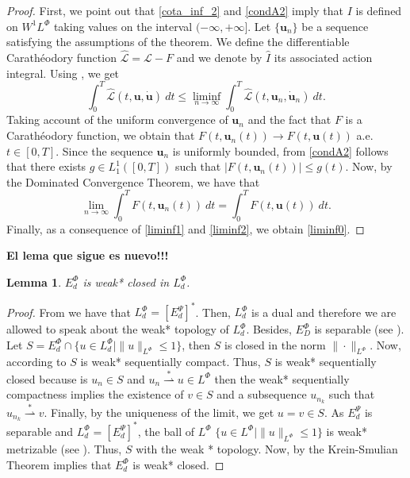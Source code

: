 \documentclass[twoside]{article}
\newtheorem{lem}[thm]{Lemma}
\theoremstyle{remark}
\newcommand{\orlnor}{\|_{L^{\Phi}}}
\newcommand{\lphi}{L^{\Phi}}
\newcommand{\ephi}{E^{\Phi}}
\newcommand{\wphi}{W^{1}\lphi}
\renewcommand{\b}[1]{\boldsymbol{#1}}
\renewcommand{\leq}{\leqslant}
\newcommand{\epsi}{E^{\Psi}}
\begin{document}
\begin{proof} First, we point out that \eqref{cota_inf_2} and \eqref{condA2} imply that $I$ is defined on $\wphi$ taking values on the interval $(-\infty,+\infty]$. 
Let $\{\b{u}_n\}$ be a sequence  satisfying the assumptions of the theorem.   We define the differentiable Carath\'eodory function $\mathcal{\hat{L}}=\mathcal{L}-F$ and we denote by $\hat{I}$ its  associated action integral. Using  \cite[Thm. 2.1, p. 243]{ekeland1999convex}, we get
\begin{equation}\label{liminf1}
\int_0^T\mathcal{\hat{L}}(t,\b{u},\b{\dot{u}})\ dt\leq \liminf_{n\to\infty}\int_0^T\mathcal{\hat{L}}(t,\b{u}_n,\b{\dot{u}}_n)\ dt.
\end{equation}
Taking account of the uniform convergence of $\b{u}_n$ and the fact that  $F$  is a  Carath\'eodory function,  we obtain that $F(t,\b{u}_n(t))\to F(t,\b{u}(t))$ a.e. $t\in[0,T]$.  Since the sequence $\b{u}_n$ is uniformly bounded, from \eqref{condA2} follows that there exists $g\in L_1^1([0,T])$ such that $|F(t,\b{u}_n(t))|\leq g(t)$. Now, by the Dominated Convergence Theorem, we have that 
\begin{equation}\label{liminf2}
\lim_{n\to\infty}\int_0^TF(t,\b{u}_n(t))\ dt=\int_0^TF(t,\b{u}(t))\ dt.
\end{equation}
Finally, as a consequence of  \eqref{liminf1} and  \eqref{liminf2}, we obtain \eqref{liminf0}.
\end{proof}

{\bf El lema que sigue es nuevo!!!}

\begin{lem}\label{lem:deb*cerrado}
$\ephi_d$ is weak* closed in $\lphi_d$.
\end{lem}


\begin{proof}
From \cite[Thm. 7, p. 110]{rao1991theory} we have that $\lphi_d=\left[\epsi_d\right]^*
$.
Then, $\lphi_d$ is a dual and therefore we are allowed to speak about the weak* topology of $\lphi_d$.
Besides, $\ephi_D$ is separable (see \cite[Thm. 1, p. 87]{rao1991theory}).
Let $S=\ephi_d\cap \{u \in \lphi_d|\|u\orlnor\leq 1\}$, then $S$ is closed in the norm $\|\cdot\orlnor$. Now, according to \cite[Cor. 5, p. 148]{rao1991theory} $S$ is weak* sequentially compact. Thus, $S$ is weak* sequentially closed because 
is $u_n\in S$ and
$u_n \overset{*}{\rightharpoonup}u \in \lphi$ then  the weak* sequentially compactness implies the existence of $v \in S$ and a subsequence $u_{n_k}$ such that 
$u_{n_k}\overset{*}{\rightharpoonup}v$. Finally, by the uniqueness of   the limit, we get
$u=v\in S$.
As $\epsi_d$ is separable and $\lphi_d=\left[\epsi_d\right]^*$, the ball of $\lphi$ $\{u \in \lphi | \|u\orlnor\leq 1\}$ is  weak* metrizable (see \cite[Thm. 5.1, p. 138]{Conway1977}).
Thus, $S$ with the weak * topology. Now, by the Krein-Smulian Theorem \cite[Cor. 12.6, p. 165]{Conway1977} implies that $\ephi_d$ is weak* closed.
\end{proof}
\end{document}
